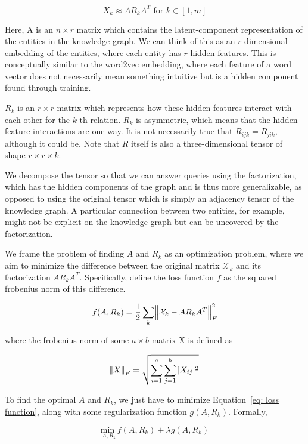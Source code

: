 \documentclass[pageno]{final_paper}
\begin{document}
$$X_k \approx A R_k A^T \text{ for } k \in [1,m]$$

Here, A is an $n\times r$ matrix which contains the latent-component
representation of the entities in the knowledge graph. We can think of this as
an $r$-dimensional embedding of the entities, where each entity has $r$ hidden
features. This is conceptually similar to the word2vec embedding, where each
feature of a word vector does not necessarily mean something intuitive but is a
hidden component found through training.

$R_k$ is an $r\times r$ matrix which represents how these hidden features
interact with each other for the $k$-th relation. $R_k$ is asymmetric, which
means that the hidden feature interactions are one-way. It is not necessarily
true that $R_{ijk} = R_{jik}$, although it could be. Note that $R$ itself is
also a three-dimensional tensor of shape $r\times r\times k$.

We decompose the tensor so that we can answer queries using the factorization,
which has the hidden components of the graph and is thus more generalizable, as
opposed to using the original tensor which is simply an adjacency tensor of the
knowledge graph. A particular connection between two entities, for example,
might not be explicit on the knowledge graph but can be uncovered by the
factorization.

We frame the problem of finding $A$ and $R_k$ as an optimization problem, where
we aim to minimize the difference between the original matrix $\mathcal{X}_k$
and its factorization $AR_kA^T$. Specifically, define the loss function $f$ as
the squared frobenius norm of this difference.

\begin{equation}
\label{eq: loss function}
    f(A, R_k) = \dfrac{1}{2} \sum_k \norm{\mathcal{X}_k - AR_kA^T}_F^2
\end{equation}

where the frobenius norm of some $a\times b$ matrix X is defined as

$$\norm{X}_F = \sqrt{\sum_{i=1}^a \sum_{j=1}^b |X_{ij}|^2}$$

To find the optimal $A$ and $R_k$, we just have to minimize Equation~\eqref{eq: loss
function}, along with some regularization function $g(A, R_k)$. Formally,

\begin{equation}
    \label{eq: to minimize}
    \underset{A, R_k}{\text{min }} f(A,R_k) + \lambda g(A, R_k)
\end{equation}
\end{document}
